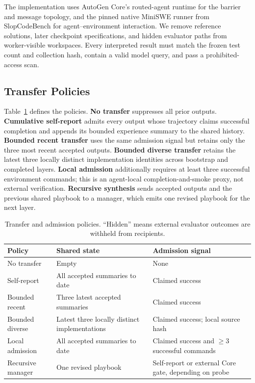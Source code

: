\documentclass[letterpaper]{article}
\begin{document}
The implementation uses AutoGen Core's routed-agent runtime for the barrier and
message topology, and the pinned native MiniSWE runner from SlopCodeBench for
agent--environment interaction. We remove reference solutions, later checkpoint
specifications, and hidden evaluator paths from worker-visible workspaces. Every
interpreted result must match the frozen test count and collection hash, contain a
valid model query, and pass a prohibited-access scan.

\subsection{Transfer Policies}

Table~\ref{tab:policies} defines the policies. \textbf{No transfer} suppresses all
prior outputs. \textbf{Cumulative self-report} admits every output whose trajectory
claims successful completion and appends its bounded experience summary to the
shared history. \textbf{Bounded recent transfer} uses the same admission signal
but retains only the three most recent accepted outputs. \textbf{Bounded diverse
transfer} retains the latest three locally distinct implementation identities
across bootstrap and completed layers. \textbf{Local admission} additionally
requires at least three
successful environment commands; this is an agent-local completion-and-smoke
proxy, not external verification. \textbf{Recursive synthesis} sends accepted
outputs and the previous shared playbook to a manager, which emits one revised
playbook for the next layer.

\begin{table}[t]
\centering
\caption{Transfer and admission policies. ``Hidden'' means external evaluator
outcomes are withheld from recipients.}
\label{tab:policies}
\begin{tabular}{p{}p{}p{}}
\toprule
Policy & Shared state & Admission signal \\
\midrule
No transfer & Empty & None \\
Self-report & All accepted summaries to date & Claimed success \\
Bounded recent & Three latest accepted summaries & Claimed success \\
Bounded diverse & Latest three locally distinct implementations & Claimed
success; local source hash \\
Local admission & All accepted summaries to date & Claimed success and
$\geq3$ successful commands \\
Recursive manager & One revised playbook & Self-report or external Core gate,
depending on probe \\
\bottomrule
\end{tabular}
\end{table}
\end{document}
